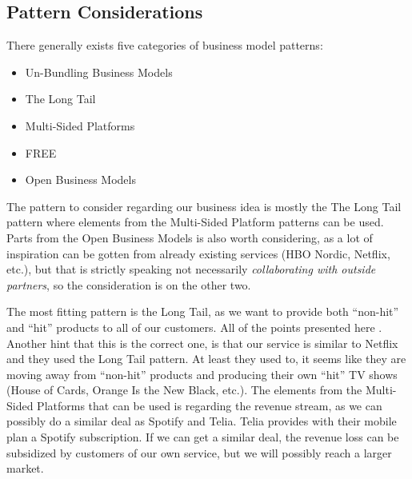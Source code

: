 \subsection{Pattern Considerations}
There generally exists five categories of business model patterns\cite{1}:
\begin{itemize}
\item Un-Bundling Business Models
\item The Long Tail
\item Multi-Sided Platforms
\item FREE
\item Open Business Models
\end{itemize}

The pattern to consider regarding our business idea is mostly the The Long Tail pattern where elements from the Multi-Sided Platform patterns can be used. Parts from the Open Business Models is also worth considering, as a lot of inspiration can be gotten from already existing services (HBO Nordic, Netflix, etc.), but that is strictly speaking not necessarily \emph{collaborating with outside partners}\cite{2}, so the consideration is on the other two.

The most fitting pattern is the Long Tail, as we want to provide both ``non-hit'' and ``hit'' products to all of our customers. All of the points presented here \cite{3}. Another hint that this is the correct one, is that our service is similar to Netflix and they used the Long Tail pattern. At least they used to, it seems like they are moving away from ``non-hit'' products and producing their own ``hit'' TV shows (House of Cards, Orange Is the New Black, etc.). The elements from the Multi-Sided Platforms that can be used is regarding the revenue stream, as we can possibly do a similar deal as Spotify and Telia. Telia provides with their mobile plan a Spotify subscription. If we can get a similar deal, the revenue loss can be subsidized by customers of our own service, but we will possibly reach a larger market.
